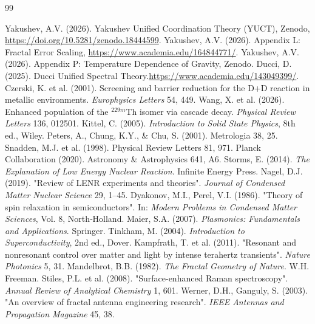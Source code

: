 \documentclass[12pt]{article}
\theoremstyle{remark}
\begin{document}
	\begin{thebibliography}{99}
		
		 Yakushev, A.V. (2026). Yakushev Unified Coordination Theory (YUCT), Zenodo, \url{https://doi.org/10.5281/zenodo.18444599}.
		 Yakushev, A.V. (2026). Appendix L: Fractal Error Scaling, \url{https://www.academia.edu/164844771/}.
		 Yakushev, A.V. (2026). Appendix P: Temperature Dependence of Gravity, Zenodo.
		 Ducci, D. (2025). Ducci Unified Spectral Theory.\url{https://www.academia.edu/143049399/}.
		 Czerski, K. et al. (2001). Screening and barrier reduction for the D+D reaction in metallic environments. \textit{Europhysics Letters} 54, 449.
		 Wang, X. et al. (2026). Enhanced population of the \(^{229m}\)Th isomer via cascade decay. \textit{Physical Review Letters} 136, 012501.
		 Kittel, C. (2005). \textit{Introduction to Solid State Physics}, 8th ed., Wiley.
		 Peters, A., Chung, K.Y., \& Chu, S. (2001). Metrologia 38, 25.
		 Snadden, M.J. et al. (1998). Physical Review Letters 81, 971.
		 Planck Collaboration (2020). Astronomy \& Astrophysics 641, A6.
		 Storms, E. (2014). \textit{The Explanation of Low Energy Nuclear Reaction}. Infinite Energy Press.
		 Nagel, D.J. (2019). "Review of LENR experiments and theories". \textit{Journal of Condensed Matter Nuclear Science} 29, 1–45.
		 Dyakonov, M.I., Perel, V.I. (1986). "Theory of spin relaxation in semiconductors". In: \textit{Modern Problems in Condensed Matter Sciences}, Vol. 8, North‑Holland.
		 Maier, S.A. (2007). \textit{Plasmonics: Fundamentals and Applications}. Springer.
		 Tinkham, M. (2004). \textit{Introduction to Superconductivity}, 2nd ed., Dover.
		 Kampfrath, T. et al. (2011). "Resonant and nonresonant control over matter and light by intense terahertz transients". \textit{Nature Photonics} 5, 31.
		 Mandelbrot, B.B. (1982). \textit{The Fractal Geometry of Nature}. W.H. Freeman.
		 Stiles, P.L. et al. (2008). "Surface-enhanced Raman spectroscopy". \textit{Annual Review of Analytical Chemistry} 1, 601.
		 Werner, D.H., Ganguly, S. (2003). "An overview of fractal antenna engineering research". \textit{IEEE Antennas and Propagation Magazine} 45, 38.
	\end{thebibliography}
	
\end{document}
